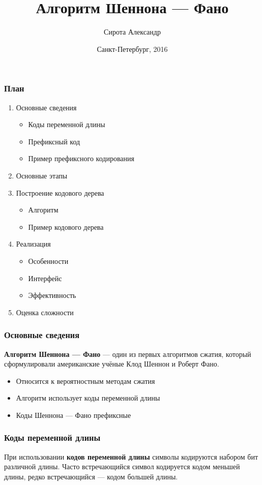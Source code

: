 \documentclass[10pt,pdf,hyperref={unicode}]{beamer}
\title{Алгоритм Шеннона --- Фано}
\author{Сирота Александр}
\institute{\normalsize{ГУАП} \\ \scriptsize{5 факультет \\ Группа 5511}}
\date[3pt]{\scriptsize{Санкт-Петербург, 2016}}
\begin{document}
\begin{frame}
	\titlepage
\end{frame}

\begin{frame}
	\frametitle{План}

	\begin{enumerate}
		\item Основные сведения
		\begin{itemize}
			\item Коды переменной длины
			\item Префиксный код
			\item Пример префиксного кодирования
		\end{itemize}
		\item Основные этапы
		\item Построение кодового дерева
		\begin{itemize}
			\item Алгоритм
			\item Пример кодового дерева
		\end{itemize}
		\item Реализация
		\begin{itemize}
			\item Особенности
			\item Интерфейс
			\item Эффективность
		\end{itemize}
		\item Оценка сложности
	\end{enumerate}
\end{frame}

\begin{frame}
	\frametitle{Основные сведения}
	\textbf{Алгоритм Шеннона --- Фано} --- один из первых алгоритмов 
	сжатия, который сформулировали американские учёные Клод Шеннон и Роберт 
	Фано.
	\begin{itemize}
		\item Относится к вероятностным методам сжатия
		\item Алгоритм использует коды переменной длины
		\item Коды Шеннона --- Фано префиксные
	\end{itemize}
\end{frame}

\begin{frame}
	\frametitle{Коды переменной длины}
	При использовании \textbf{кодов переменной длины} символы кодируются набором бит различной длины.
	Часто встречающийся символ кодируется кодом меньшей длины, редко встречающийся --- кодом большей длины.
\end{frame}
\end{document}
